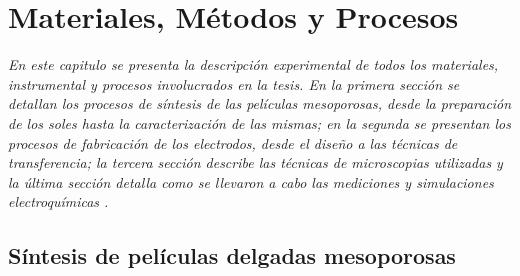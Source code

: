  \newcommand{\NoBiblioMat}[1]{
 \ifthenelse{\equal{#1}{verdadero}}{}{}
 \NoBiblioMat{verdadero}}


 \FormatoCapituloUnaLinea

 \chapter{Materiales, Métodos y Procesos}\label{chap:Materiales}

 \thispagestyle{empty}
	
  \noindent\textit{En este capitulo se presenta la descripción experimental de todos los materiales, instrumental y procesos involucrados en la tesis. En la primera sección se detallan los procesos de síntesis de las películas mesoporosas, desde la preparación de los soles hasta la caracterización de las mismas; en la segunda se presentan los procesos de fabricación de los electrodos, desde el diseño a las técnicas de transferencia; la tercera sección describe las técnicas de microscopias utilizadas y la última sección detalla como se llevaron a cabo las mediciones y simulaciones electroquímicas .}


 \vfill
 \minitoc
 \newpage


\section{Síntesis de películas delgadas mesoporosas}\label{sec:sintesis_mesoporosos}	
	
